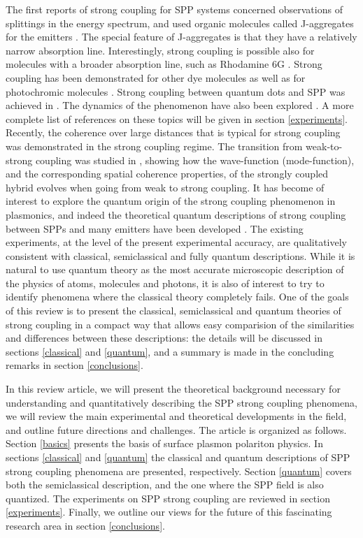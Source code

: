 \documentclass[12pt]{iopart}
\begin{document}
The first reports of strong coupling for SPP systems concerned observations of splittings in the energy spectrum, and used organic molecules called J-aggregates for the emitters \cite{Bellessa2004,Dintinger2005,Dintinger2006,Sugawara2006,Wurtz2007,Chovan2008,Fofang2008,Bellessa2009}. The special feature of J-aggregates is that they have a relatively narrow absorption line. Interestingly, strong coupling is possible also for molecules with a broader absorption line, such as Rhodamine 6G \cite{Hakala2009,Cade2009,Rodriguez2013,Vakevainen2013,Shi2014}. Strong coupling has been demonstrated for other dye molecules \cite{Valmorra2011,Baieva2012} as well as for photochromic molecules \cite{Schwartz2011}. Strong coupling between quantum dots and SPP was achieved in \cite{Gomez2010a}. The dynamics of the phenomenon have also been explored \cite{Hakala2009,Vasa_ACSNano_2010_4_7559,Vasa2013}. A more complete list of references on these topics will be given in section \ref{experiments}. Recently, the coherence over large distances that is typical for strong coupling was demonstrated \cite{AberraGuebrou2012} in the strong coupling regime. The transition from weak-to-strong coupling was studied in \cite{Shi2014}, showing how the wave-function (mode-function), and the corresponding spatial coherence properties, of the strongly coupled hybrid evolves when going from weak to strong coupling. It has become of interest to explore the quantum origin of the strong coupling phenomenon in plasmonics, and indeed the theoretical quantum descriptions of strong coupling between SPPs and many emitters have been developed \cite{Gonzalez-Tudela2013}. The existing experiments, at the level of the present experimental accuracy, are qualitatively consistent with classical, semiclassical and fully quantum descriptions. While it is natural to use quantum theory as the most accurate microscopic description of the physics of atoms, molecules and photons, it is also of interest to try to identify phenomena where the classical theory completely fails. One of the goals of this review is to present the classical, semiclassical and quantum theories of strong coupling in a compact way that allows easy comparision of the similarities and differences between these descriptions: the details will be discussed in sections \ref{classical} and \ref{quantum}, and a summary is made in the concluding remarks in section \ref{conclusions}.

In this review article, we will present the theoretical background necessary for understanding and quantitatively describing the SPP strong coupling phenomena, we will review the main experimental and theoretical developments in the field, and outline future directions and challenges. The article is organized as follows. Section \ref{basics} presents the basis of surface plasmon polariton physics. In sections \ref{classical} and \ref{quantum} the classical and quantum descriptions of SPP strong coupling phenomena are presented, respectively. Section \ref{quantum} covers both the semiclassical description, and the one where the SPP field is also quantized. The experiments on SPP strong coupling are reviewed in section \ref{experiments}. Finally, we outline our views for the future of this fascinating research area in section \ref{conclusions}.
\end{document}
